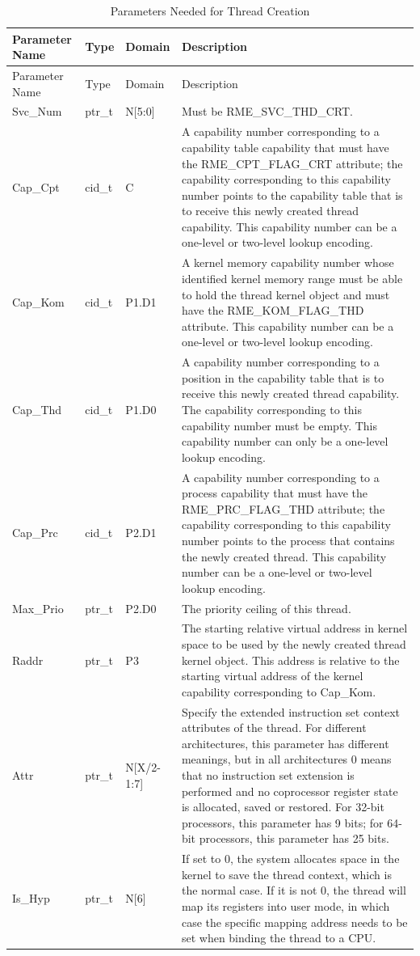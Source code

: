 \begin{xltabular}{\textwidth}{@{}>{\hsize\raggedright\arraybackslash}X>{\hsize\raggedright\arraybackslash}X>{\hsize\raggedright\arraybackslash}X>{\hsize\raggedright\arraybackslash}X@{}}
\caption{Parameters Needed for Thread Creation}\label{tab:4-20-create-thread-parameters}\\
\toprule
Parameter Name & Type & Domain & Description\tabularnewline
\endfirsthead
\toprule
Parameter Name & Type & Domain & Description\tabularnewline
\midrule
\endhead
\bottomrule
\endlastfoot
Svc\_Num & ptr\_t & N{[}5:0{]} & Must be RME\_SVC\_THD\_CRT.\tabularnewline
Cap\_Cpt & cid\_t & C &
A capability number corresponding to a capability table capability that must have the RME\_CPT\_FLAG\_CRT attribute; the capability corresponding to this capability number points to the capability table that is to receive this newly created thread capability. This capability number can be a one-level or two-level lookup encoding.\tabularnewline
Cap\_Kom & cid\_t & P1.D1 &
A kernel memory capability number whose identified kernel memory range must be able to hold the thread kernel object and must have the RME\_KOM\_FLAG\_THD attribute. This capability number can be a one-level or two-level lookup encoding.\tabularnewline
Cap\_Thd & cid\_t & P1.D0 &
A capability number corresponding to a position in the capability table that is to receive this newly created thread capability. The capability corresponding to this capability number must be empty. This capability number can only be a one-level lookup encoding.\tabularnewline
Cap\_Prc & cid\_t & P2.D1 &
A capability number corresponding to a process capability that must have the RME\_PRC\_FLAG\_THD attribute; the capability corresponding to this capability number points to the process that contains the newly created thread. This capability number can be a one-level or two-level lookup encoding.\tabularnewline
Max\_Prio & ptr\_t & P2.D0 & The priority ceiling of this thread.\tabularnewline
Raddr & ptr\_t & P3 &
The starting relative virtual address in kernel space to be used by the newly created thread kernel object. This address is relative to the starting virtual address of the kernel capability corresponding to Cap\_Kom.\tabularnewline
Attr & ptr\_t & N{[}X/2-1:7{]} &
Specify the extended instruction set context attributes of the thread. For different architectures, this parameter has different meanings, but in all architectures 0 means that no instruction set extension is performed and no coprocessor register state is allocated, saved or restored. For 32-bit processors, this parameter has 9 bits; for 64-bit processors, this parameter has 25 bits.\tabularnewline
Is\_Hyp & ptr\_t & N{[}6{]} &
If set to 0, the system allocates space in the kernel to save the thread context, which is the normal case. If it is not 0, the thread will map its registers into user mode, in which case the specific mapping address needs to be set when binding the thread to a CPU.\tabularnewline
\end{xltabular}
\nopagebreak[4]

